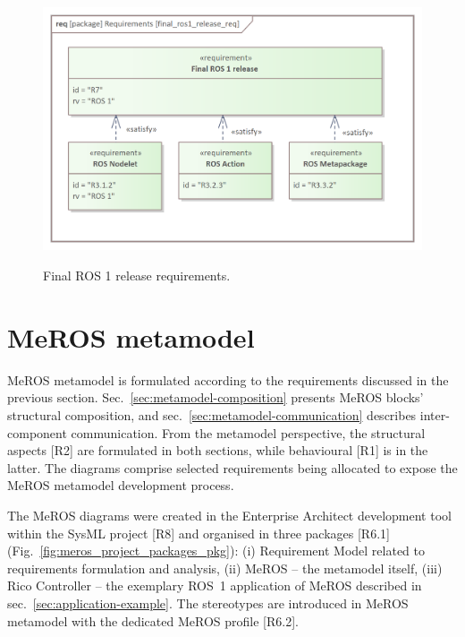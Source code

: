 \documentclass{ieeeaccess}
\begin{document}
	\begin{figure}[htb]
		\centering
		\begin{center}
			{\includegraphics[scale=0.7]{img/requirement_pkg/final_ros1_release_req.png}}
		\end{center}
		\caption{Final ROS 1 release requirements.} 
		\label{fig:final_ros1_release_req}
	\end{figure}
	
	
	
\section{MeROS metamodel}
\label{sec:metamodel}
	
	MeROS metamodel is formulated according to the requirements discussed in the previous section. Sec.~\ref{sec:metamodel-composition} presents MeROS blocks' structural composition, and sec.~\ref{sec:metamodel-communication} describes inter-component communication. From the metamodel perspective, the structural aspects [R2] are formulated in both sections, while behavioural [R1] is in the latter. The diagrams comprise selected requirements being allocated to expose the MeROS metamodel development process. 
	
	The MeROS diagrams were created in the Enterprise Architect development tool within the SysML project [R8] and organised in three packages [R6.1] (Fig.~\ref{fig:meros_project_packages_pkg}): (i) Requirement Model related to requirements formulation and analysis, (ii) MeROS -- the metamodel itself, (iii) Rico Controller -- the exemplary ROS~1 application of MeROS described in sec.~\ref{sec:application-example}. The stereotypes are introduced in MeROS metamodel with the dedicated MeROS profile [R6.2].
	
\end{document}
